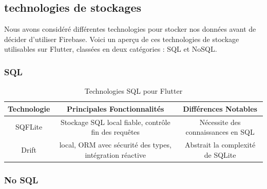 \subsection{technologies de stockages}

Nous avons considéré différentes technologies pour stocker nos données avant de décider d'utiliser Firebase. Voici un aperçu de ces technologies de stockage utilisables sur Flutter, classées en deux catégories : SQL et NoSQL.

\subsubsection{SQL}

\begin{table}[h!]
    \centering
    \begin{tabular}{|c|c|c|}
        \hline
        \textbf{Technologie} & \textbf{Principales Fonctionnalités}                     & \textbf{Différences Notables}      \\
        \hline
        SQFLite              & Stockage SQL local fiable, contrôle fin des requêtes     & Nécessite des connaissances en SQL \\
        \hline
        Drift                & local, ORM avec sécurité des types, intégration réactive & Abstrait la complexité de SQLite   \\
        \hline
    \end{tabular}
    \caption{Technologies SQL pour Flutter}
\end{table}

\subsubsection{No SQL}

